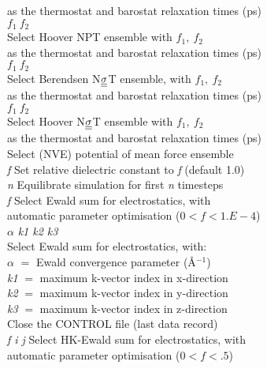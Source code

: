 \begin{tabbing}
\> \>as the thermostat and  barostat relaxation times (ps) \\
 $f_{1}~f_{2}$ \\
\> \>Select Hoover NPT ensemble with  $f_{1},~f_{2}$ \\
\> \> as the thermostat and barostat relaxation times (ps) \\
 $f_{1}~f_{2}$ \\
\> \>Select Berendsen N$\mbox{$\underline{\underline{\bf \sigma}}$}$T
ensemble, with $f_{1},~f_{2}$
\\
\> \> as the thermostat and  barostat relaxation times (ps) \\
 $f_{1}~f_{2}$ \\
\> \>Select Hoover N$\mbox{$\underline{\underline{\bf \sigma}}$}$T ensemble with $f_{1},~f_{2}$ \\
\> \> as the thermostat and barostat relaxation times (ps) \\
\> Select (NVE) potential of mean force ensemble \\
 {\em f}\> Set relative dielectric constant to {\em f}
(default 1.0)\\
 {\em n} \> Equilibrate simulation for first {\em n}
timesteps\\
 {\em f} \> Select Ewald sum for electrostatics, with  \\
\> \>automatic parameter optimisation ($0<f<1.E-4$) \\
  $\alpha$ {\em k1 k2 k3} \\
\> \> Select Ewald sum for electrostatics, with:\\
\> \> $\alpha$ $=$ Ewald convergence parameter (\AA$^{-1}$)\\
\> \> {\em k1} $=$ maximum k-vector index in x-direction\\
\> \> {\em k2} $=$ maximum k-vector index in y-direction\\
\> \> {\em k3} $=$ maximum k-vector index in z-direction\\
 \> Close the CONTROL file (last data record)\\
 {\em f i j} \>Select HK-Ewald
sum for electrostatics, with  \\
\> \>automatic parameter optimisation ($0<f<.5$) \\

\end{tabbing}

